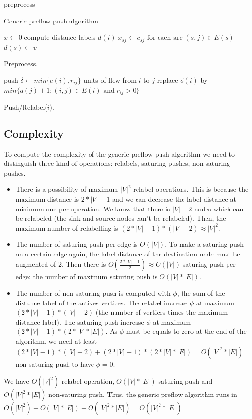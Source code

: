 \begin{algorithm}
 preprocess\;
\caption{Generic preflow-push algorithm.}
\end{algorithm}

\begin{algorithm}
 $x\gets 0$\;
 compute distance labels $d(i)$\;
 $x_{sj}\gets c_{sj} \text{ for each arc } (s, j) \in E(s)$\;
 $d(s)\gets v$\;
\caption{Preprocess.}
\end{algorithm}

\begin{algorithm}
  {push $\delta\gets min\{e(i), r_{ij}\}$ units of flow from $i$ to $j$\;}
\Else
   {replace $d(i)$ by $min\{d(j)+1 : (i, j) \in E(i) \text{ and } r_{ij} > 0 \}$\;}
\caption{Push/Relabel($i$).}
\end{algorithm}

\subsection{Complexity}

To compute the complexity of the generic preflow-push algorithm we need to distinguish three kind of operations: relabels, saturing pushes, non-saturing pushes.
\begin{itemize}
\item There is a possibility of maximum $|V|^2$ relabel operations. This is because the maximum distance is $2*|V| - 1$ and we can decrease the label distance at minimum one per operation. We know that there is $|V| - 2$ nodes which can be relabeled (the sink and source nodes can't be relabeled). Then, the maximum number of relabelling is $(2*|V| - 1) * (|V| - 2) \approx |V|^2$.

\item The number of saturing push per edge is $O(|V|)$. To make a saturing push on a certain edge again, the label distance of the destination node must be augmented of 2. Then there is $O(\frac{2*|V| - 1}{2}) \approx O(|V|)$ saturing push per edge: the number of maximum saturing push is $O(|V|*|E|)$.

\item The number of non-saturing push is computed with $\phi$, the sum of the distance label of the actives vertices. The relabel increase $\phi$ at maximum $(2*|V| - 1)*(|V|-2)$ (the number of vertices times the maximum distance label). The saturing push increase $\phi$ at maximum $(2*|V|-1)*(2*|V|*|E|)$. As $\phi$ must be equals to zero at the end of the algorithm, we need at least $(2*|V|-1)*(|V|-2) + (2*|V|-1)*(2*|V|*|E|) = O(|V|^2*|E|)$ non-saturing push to have $\phi = 0$.
\end{itemize}
We have $O(|V|^2)$ relabel operation, $O(|V|*|E|)$ saturing push and $O(|V|^2*|E|)$ non-saturing push. Thus, the generic preflow algorithm runs in $O(|V|^2) + O(|V|*|E|) + O(|V|^2*|E|) = O(|V|^2 *|E|)$. %
